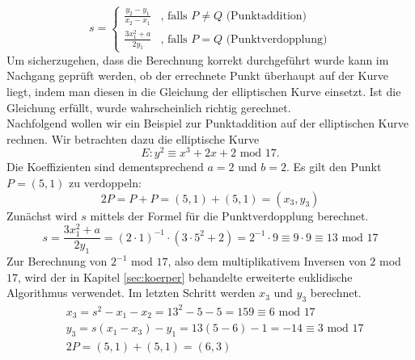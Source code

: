 $$s = \begin{cases}
	\frac{y_2 - y_1}{x_2 -x_1} & \text{, falls } P \neq Q \text{ (Punktaddition)}\\
	\frac{3x_1^2 + a}{2y_1} & \text{, falls } P = Q \text{ (Punktverdopplung)}
	\end{cases}
$$
Um sicherzugehen, dass die Berechnung korrekt durchgeführt wurde kann im Nachgang geprüft werden, ob der errechnete Punkt überhaupt auf der Kurve liegt, indem man diesen in die Gleichung der elliptischen Kurve einsetzt. Ist die Gleichung erfüllt, wurde wahrscheinlich richtig gerechnet.\\

Nachfolgend wollen wir ein Beispiel zur Punktaddition auf der elliptischen Kurve rechnen. Wir betrachten dazu die elliptische Kurve $$E : y^2 \equiv x^3 +2x +2 \text{ mod } 17.$$ Die Koeffizienten sind dementsprechend $a=2$ und $b=2$. Es gilt den Punkt $P = (5,1)$ zu verdoppeln:
$$2P = P + P = (5,1) + (5,1) = (x_3, y_3)$$
Zunächst wird $s$ mittels der Formel für die Punktverdopplung berechnet.
$$s = \frac{3x_1^2 + a}{2y_1} = (2 \cdot 1)^{-1} \cdot ( 3 \cdot 5^2 + 2) = 2^{-1} \cdot 9 \equiv 9 \cdot 9 \equiv 13 \text{ mod } 17$$
Zur Berechnung von $2^{-1}$ mod $17$, also dem multiplikativem Inversen von $2$ mod $17$, wird der in Kapitel \ref{sec:koerper} behandelte erweiterte euklidische Algorithmus verwendet. Im letzten Schritt werden $x_3$ und $y_3$ berechnet.
\begin{align*}
&x_3 = s^2 - x_1 - x_2 = 13^2 -5 -5 = 159 \equiv 6 \text{ mod } 17\\
&y_3 = s(x_1 - x_3) - y_1 = 13(5-6) -1 = -14 \equiv 3 \text{ mod } 17\\
&2P = (5,1) + (5,1) = (6,3)
\end{align*}







